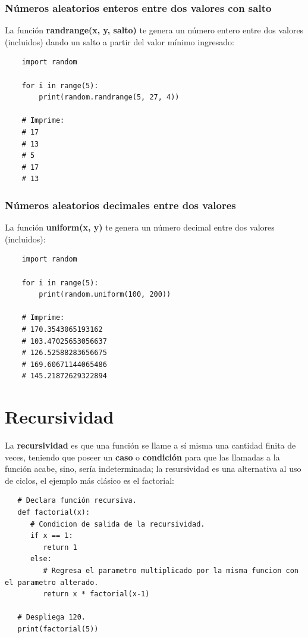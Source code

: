 \subsubsection{Números aleatorios enteros entre dos valores con salto}
\hspace{0.55cm}La función \textbf{randrange(x, y, salto)} te genera un número entero entre dos valores (incluidos) dando un salto a partir del valor mínimo ingresado:
\begin{lstlisting}
	import random

	for i in range(5):
		print(random.randrange(5, 27, 4))

	# Imprime:
	# 17
	# 13
	# 5
	# 17
	# 13
\end{lstlisting}


\subsubsection{Números aleatorios decimales entre dos valores}
\hspace{0.55cm}La función \textbf{uniform(x, y)} te genera un número decimal entre dos valores (incluidos):
\begin{lstlisting}
	import random

	for i in range(5):
		print(random.uniform(100, 200))

	# Imprime:
	# 170.3543065193162
	# 103.47025653056637
	# 126.52588283656675
	# 169.60671144065486
	# 145.21872629322894
\end{lstlisting}



\section{Recursividad}
\hspace{0.55cm}La \textbf{recursividad} es que una función se llame a sí misma una cantidad finita de veces, teniendo que poseer un \textbf{caso} o \textbf{condición} para que las llamadas a la función acabe, sino, sería indeterminada; la resursividad es una alternativa al uso de ciclos, el ejemplo más clásico es el factorial:
\begin{lstlisting}
   # Declara función recursiva.
   def factorial(x):
      # Condicion de salida de la recursividad.
      if x == 1:
         return 1
      else:
         # Regresa el parametro multiplicado por la misma funcion con el parametro alterado.
         return x * factorial(x-1)

   # Despliega 120.
   print(factorial(5))
\end{lstlisting}


